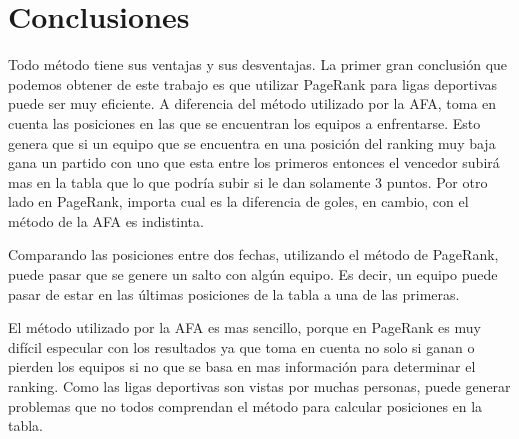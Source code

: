 \section{Conclusiones}

Todo método tiene sus ventajas y sus desventajas. La primer gran conclusión que podemos obtener de este trabajo es que utilizar PageRank para ligas deportivas puede ser muy eficiente. A diferencia del método utilizado por la AFA, toma en cuenta las posiciones en las que se encuentran los equipos a enfrentarse. Esto genera que si un equipo que se encuentra en una posición del ranking muy baja gana un partido con uno que esta entre los primeros entonces el vencedor subirá mas en la tabla que lo que podría subir si le dan solamente 3 puntos. Por otro lado en PageRank, importa cual es la diferencia de goles, en cambio, con el método de la AFA es indistinta.

Comparando las posiciones entre dos fechas, utilizando el método de PageRank, puede pasar que se genere un salto con algún equipo. Es decir, un equipo puede pasar de estar en las últimas posiciones de la tabla a una de las primeras.

El método utilizado por la AFA es mas sencillo, porque en PageRank es muy difícil especular con los resultados ya que toma en cuenta no solo si ganan o pierden los equipos si no que se basa en mas información para determinar el ranking. Como las ligas deportivas son vistas por muchas personas, puede generar problemas que no todos comprendan el método para calcular posiciones en la tabla. 